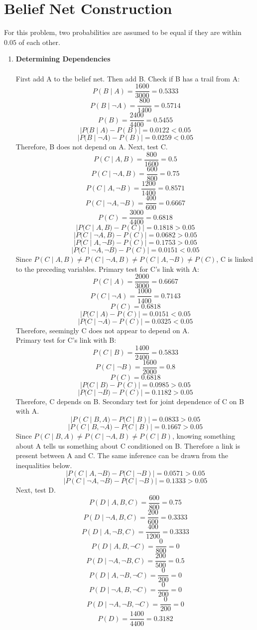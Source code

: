 \documentclass[english]{article}
\begin{document}
\section{Belief Net Construction}
For this problem, two probabilities are assumed to be equal if they are within $0.05$ of each other. 
\begin{enumerate}
    \item \textbf{Determining Dependencies} \\ \\
    First add A to the belief net. Then add B. Check if B has a trail from A:
    $$P(B \;|\; A) = \frac{1600}{3000} = 0.5333$$
    $$P(B \;|\; \neg A) = \frac{800}{1400} = 0.5714$$
    $$P(B) = \frac{2400}{4400} = 0.5455$$
    $$|P(B \;|\; A) - P(B)| = 0.0122 < 0.05$$
    $$|P(B \;|\; \neg A) - P(B)| = 0.0259 < 0.05$$
    Therefore, B does not depend on A.
    Next, test C.
    $$P(C \;|\; A,B) = \frac{800}{1600} = 0.5$$
    $$P(C \;|\; \neg A, B) = \frac{600}{800} = 0.75$$
    $$P(C \;|\; A, \neg B) = \frac{1200}{1400} = 0.8571$$
    $$P(C \;|\; \neg A, \neg B) = \frac{400}{600} = 0.6667$$
    $$P(C) = \frac{3000}{4400} = 0.6818$$
    $$|P(C \;|\; A,B) - P(C)| = 0.1818 > 0.05$$
    $$|P(C \;|\; \neg A,B) - P(C)| = 0.0682 > 0.05$$
    $$|P(C \;|\; A,\neg B) - P(C)| = 0.1753 > 0.05$$
    $$|P(C \;|\; \neg A,\neg B) - P(C)| = 0.0151 < 0.05$$
    Since $P(C \;|\; A,B) \neq P(C \;|\; \neg A,B) \neq P(C \;|\; A, \neg B) \neq P(C)$, C is linked to the preceding variables.
    Primary test for C's link with A:
    $$P(C \;|\; A) = \frac{2000}{3000} = 0.6667$$
    $$P(C \;|\; \neg A) = \frac{1000}{1400} = 0.7143$$
    $$P(C) = 0.6818$$
    $$|P(C \;|\; A) - P(C)| = 0.0151 < 0.05$$
    $$|P(C \;|\; \neg A) - P(C)| = 0.0325 < 0.05$$
    Therefore, seemingly C does not appear to depend on A. \\
    Primary test for C's link with B:
     $$P(C \;|\; B) = \frac{1400}{2400} = 0.5833$$
    $$P(C \;|\; \neg B) = \frac{1600}{2000} = 0.8$$
    $$P(C) = 0.6818$$
    $$|P(C \;|\; B) - P(C)| = 0.0985 > 0.05$$
    $$|P(C \;|\; \neg B) - P(C)| = 0.1182 > 0.05$$
    Therefore, C depends on B.
    Secondary test for joint dependence of C on B with A.
    $$|P(C \;|\; B, A) - P(C \;|\; B)| = 0.0833 > 0.05$$
    $$|P(C \;|\; B, \neg A) - P(C \;|\; B)| = 0.1667 > 0.05$$
    Since $P(C \;|\; B, A) \neq P(C \;|\; \neg A, B) \neq P(C \;|\; B)$, knowing something about A tells us something about C conditioned on B. Therefore a link is present between A and C. The same inference can be drawn from the inequalities below. 
    $$|P(C \;|\; A, \neg B) - P(C \;|\; \neg B)| = 0.0571 > 0.05$$
    $$|P(C \;|\; \neg A, \neg B) - P(C \;|\; \neg B)| = 0.1333 > 0.05$$
    Next, test D.
    $$P(D \;|\; A,B,C) = \frac{600}{800} = 0.75$$
    $$P(D \;|\; \neg A,B,C) = \frac{200}{600} = 0.3333$$
    $$P(D \;|\; A, \neg B,C) = \frac{400}{1200} = 0.3333$$
    $$P(D \;|\; A,B,\neg C) = \frac{0}{800} = 0$$
    $$P(D \;|\; \neg A,\neg B,C) = \frac{200}{500} = 0.5$$
    $$P(D \;|\; A,\neg B,\neg C) = \frac{0}{200} = 0$$
    $$P(D \;|\; \neg A,B,\neg C) = \frac{0}{200} = 0$$
    $$P(D \;|\; \neg A,\neg B,\neg C) = \frac{0}{200} = 0$$
    $$P(D) = \frac{1400}{4400} = 0.3182$$
        

\end{enumerate}
\end{document}
